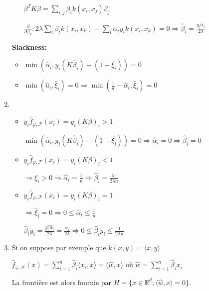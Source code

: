 \documentclass[10pt,a4paper,oneside]{article}
\begin{document}
\begin{enumerate}
\begin{itemize}
$\beta^T K \beta = \sum_{i,j} \beta_i k(x_i,x_j) \beta_j$

$\frac{\partial}{\partial \beta_k} : 2 \lambda \sum_i \beta_i k(x_i,x_k) - \sum_i \alpha_i y_i k(x_i,x_k) = 0 \Rightarrow \boxed{ \hat{\beta}_i = \frac{y_i \hat{\alpha}_i}{2 \lambda} }$
\end{itemize}

\textbf{Slackness:}
\begin{itemize}
\item
$\boxed{ \min (\hat{\alpha}_i, y_i (K \hat{\beta}_i) - (1 - \hat{\xi}_i)) = 0}$

\item
$\min(\hat{u}_i, \hat{\xi}_i) = 0 \Rightarrow \boxed{ \min(\frac{1}{n} - \hat{\alpha}_i, \hat{\xi}_i) = 0 }$
\end{itemize}

\item
\begin{itemize}
\item
$y_i \hat{f}_{\varphi, \mathcal{F}}(x_i) = y_i (K \beta)_i > 1$

$\min (\hat{\alpha}_i, y_i (K \hat{\beta}_i) - (1 - \hat{\xi}_i)) = 0 \Rightarrow \hat{\alpha}_i = 0 \Rightarrow \boxed{ \hat{\beta}_i = 0 }$

\item
$y_i \hat{f}_{\varphi, \mathcal{F}}(x_i) = y_i (K \beta)_i < 1$

$\Rightarrow \xi_i > 0 \Rightarrow \hat{\alpha}_i = \frac{1}{n} \Rightarrow \boxed{ \hat{\beta}_i = \frac{y_i}{2 \lambda n} }$

\item
$y_i \hat{f}_{\varphi, \mathcal{F}}(x_i) = y_i (K \beta)_i = 1$

$\Rightarrow \hat{\xi}_i = 0 \Rightarrow 0 \leq \hat{\alpha}_i \leq \frac{1}{n}$

$\hat{\beta}_i y_i = \frac{y_i^2 \hat{\alpha}_i}{2 \lambda} = \frac{\hat{\alpha}_i}{2 \lambda} \Rightarrow \boxed{ 0 \leq \hat{\beta}_i y_i \leq \frac{1}{2 \lambda n} }$
\end{itemize}

\item
Si on suppose par exemple que $k(x,y) = \langle x,y \rangle$

$\hat{f}_{\varphi, \mathcal{F}}(x) = \sum_{i = 1}^n \hat{\beta}_i \langle x_i,x \rangle = \langle \hat{w},x \rangle$ où $\hat{w} = \sum_{i = 1}^n \hat{\beta}_i x_i$

La frontière est alors fournie par $H = \{ x \in \mathbb{R}^d ; \langle \hat{w},x \rangle = 0 \}$.


\end{enumerate}
\end{document}
